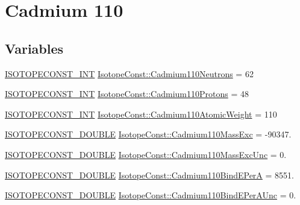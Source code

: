 \hypertarget{group___isotope_const-_cadmium-_cd110}{}\section{Cadmium 110}
\label{group___isotope_const-_cadmium-_cd110}
\subsection*{Variables}
\begin{DoxyCompactItemize}
\item 
\mbox{\hyperlink{group___isotope_const-_macros_ga5f18360b3e99483a35c32d789e62621c}{I\+S\+O\+T\+O\+P\+E\+C\+O\+N\+S\+T\+\_\+\+I\+NT}} \mbox{\hyperlink{group___isotope_const-_cadmium-_cd110_gab95ae0414c1f4ae6f20dd9e92b053940}{Isotope\+Const\+::\+Cadmium110\+Neutrons}} = 62
\item 
\mbox{\hyperlink{group___isotope_const-_macros_ga5f18360b3e99483a35c32d789e62621c}{I\+S\+O\+T\+O\+P\+E\+C\+O\+N\+S\+T\+\_\+\+I\+NT}} \mbox{\hyperlink{group___isotope_const-_cadmium-_cd110_gaaca674fcee1c31cb4198cd5725ca9e49}{Isotope\+Const\+::\+Cadmium110\+Protons}} = 48
\item 
\mbox{\hyperlink{group___isotope_const-_macros_ga5f18360b3e99483a35c32d789e62621c}{I\+S\+O\+T\+O\+P\+E\+C\+O\+N\+S\+T\+\_\+\+I\+NT}} \mbox{\hyperlink{group___isotope_const-_cadmium-_cd110_gaad02d7d5ed627304153bfe749e026c22}{Isotope\+Const\+::\+Cadmium110\+Atomic\+Weight}} = 110
\item 
\mbox{\hyperlink{group___isotope_const-_macros_ga8f45a7272ce02c0b4c65c44636ed719a}{I\+S\+O\+T\+O\+P\+E\+C\+O\+N\+S\+T\+\_\+\+D\+O\+U\+B\+LE}} \mbox{\hyperlink{group___isotope_const-_cadmium-_cd110_gaf4acddbfea974a312ed8d256e13d7472}{Isotope\+Const\+::\+Cadmium110\+Mass\+Exc}} = -\/90347.
\item 
\mbox{\hyperlink{group___isotope_const-_macros_ga8f45a7272ce02c0b4c65c44636ed719a}{I\+S\+O\+T\+O\+P\+E\+C\+O\+N\+S\+T\+\_\+\+D\+O\+U\+B\+LE}} \mbox{\hyperlink{group___isotope_const-_cadmium-_cd110_ga0370034ef7162074eab1191fd308211d}{Isotope\+Const\+::\+Cadmium110\+Mass\+Exc\+Unc}} = 0.
\item 
\mbox{\hyperlink{group___isotope_const-_macros_ga8f45a7272ce02c0b4c65c44636ed719a}{I\+S\+O\+T\+O\+P\+E\+C\+O\+N\+S\+T\+\_\+\+D\+O\+U\+B\+LE}} \mbox{\hyperlink{group___isotope_const-_cadmium-_cd110_ga2b60c46d704c82cb9ae2be85c04283e0}{Isotope\+Const\+::\+Cadmium110\+Bind\+E\+PerA}} = 8551.
\item 
\mbox{\hyperlink{group___isotope_const-_macros_ga8f45a7272ce02c0b4c65c44636ed719a}{I\+S\+O\+T\+O\+P\+E\+C\+O\+N\+S\+T\+\_\+\+D\+O\+U\+B\+LE}} \mbox{\hyperlink{group___isotope_const-_cadmium-_cd110_ga8b9c1be4570ac17ad89c1dacf683ed4a}{Isotope\+Const\+::\+Cadmium110\+Bind\+E\+Per\+A\+Unc}} = 0.

\end{DoxyCompactItemize}
